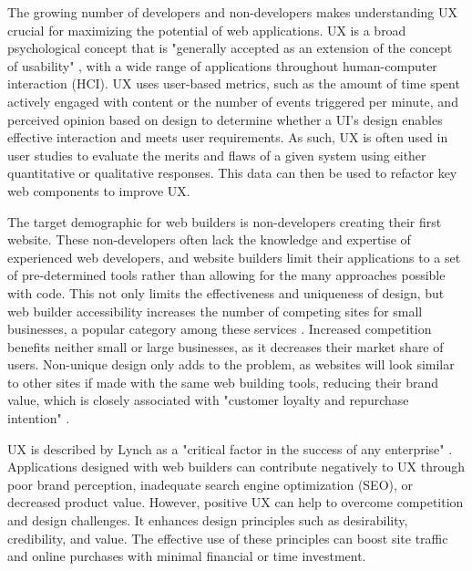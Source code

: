 \documentclass[article]{IEEEtran}
\begin{document}
        The growing number of developers and non-developers makes understanding UX crucial for maximizing the potential of web applications. UX is a broad psychological concept that is "generally accepted as an extension of the concept of usability" \cite{provost}, with a wide range of applications throughout human-computer interaction (HCI). UX uses user-based metrics, such as the amount of time spent actively engaged with content or the number of events triggered per minute, and perceived opinion based on design to determine whether a UI's design enables effective interaction and meets user requirements. As such, UX is often used in user studies to evaluate the merits and flaws of a given system using either quantitative or qualitative responses. This data can then be used to refactor key web components to improve UX.
        
        The target demographic for web builders is non-developers creating their first website. These non-developers often lack the knowledge and expertise of experienced web developers, and website builders limit their applications to a set of pre-determined tools rather than allowing for the many approaches possible with code. This not only limits the effectiveness and uniqueness of design, but web builder accessibility increases the number of competing sites for small businesses, a popular category among these services \cite{ndukwe}. Increased competition benefits neither small or large businesses, as it decreases their market share of users. Non-unique design only adds to the problem, as websites will look similar to other sites if made with the same web building tools, reducing their brand value, which is closely associated with "customer loyalty and repurchase intention" \cite{mohd-any}.
        
        UX is described by Lynch as a "critical factor in the success of any enterprise" \cite{lynch}. Applications designed with web builders can contribute negatively to UX through poor brand perception, inadequate search engine optimization (SEO), or decreased product value. However, positive UX can help to overcome competition and design challenges. It enhances design principles such as desirability, credibility, and value\cite{morville}. The effective use of these principles can boost site traffic and online purchases \cite{cai} with minimal financial or time investment.
\end{document}
